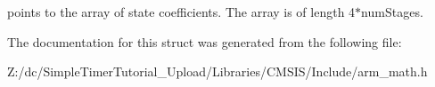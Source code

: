 points to the array of state coefficients. The array is of length 4$\ast$num\-Stages. 

The documentation for this struct was generated from the following file\-:\begin{DoxyCompactItemize}
\item 
Z\-:/dc/\-Simple\-Timer\-Tutorial\-\_\-\-Upload/\-Libraries/\-C\-M\-S\-I\-S/\-Include/arm\-\_\-math.\-h\end{DoxyCompactItemize}
